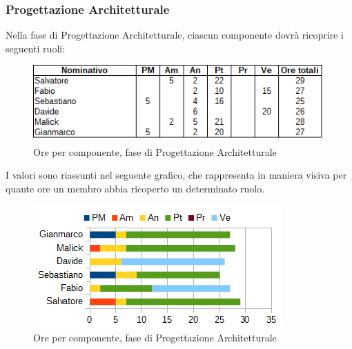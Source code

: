 		\subsubsection{Progettazione Architetturale}
		Nella fase di Progettazione Architetturale, ciascun componente dovrà ricoprire i seguenti ruoli: \\
		\begin{figure}[H]
			\centering
			\includegraphics[scale=0.75]{immagini/tabelle/progettazione_architetturale.png}
			\caption{Ore per componente, fase di Progettazione Architetturale}
		\end{figure}
		I valori sono riassunti nel seguente grafico, che rappresenta in maniera visiva per quante ore un membro abbia ricoperto un determinato ruolo. \\
		\begin{figure}[H]
			\centering
			\includegraphics[scale=1]{immagini/grafici/progettazione_architetturale-barra.png}
			\caption{Ore per componente, fase di Progettazione Architetturale}
		\end{figure}
